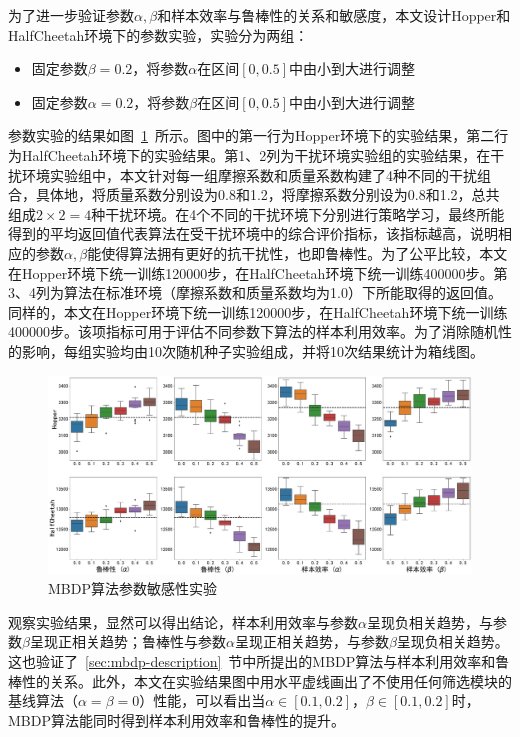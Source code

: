 为了进一步验证参数$\alpha,\beta$和样本效率与鲁棒性的关系和敏感度，本文设计Hopper和HalfCheetah环境下的参数实验，实验分为两组：

\begin{itemize}
    \item 固定参数$\beta=0.2$，将参数$\alpha$在区间$[0,0.5]$中由小到大进行调整
    \item 固定参数$\alpha=0.2$，将参数$\beta$在区间$[0,0.5]$中由小到大进行调整
\end{itemize}

参数实验的结果如图~\ref{fig:hyper-performance}~所示。图中的第一行为Hopper环境下的实验结果，第二行为HalfCheetah环境下的实验结果。第1、2列为干扰环境实验组的实验结果，在干扰环境实验组中，本文针对每一组摩擦系数和质量系数构建了4种不同的干扰组合，具体地，将质量系数分别设为0.8和1.2，将摩擦系数分别设为0.8和1.2，总共组成$2\times 2=4$种干扰环境。在4个不同的干扰环境下分别进行策略学习，最终所能得到的平均返回值代表算法在受干扰环境中的综合评价指标，该指标越高，说明相应的参数$\alpha,\beta$能使得算法拥有更好的抗干扰性，也即鲁棒性。为了公平比较，本文在Hopper环境下统一训练120000步，在HalfCheetah环境下统一训练400000步。第3、4列为算法在标准环境（摩擦系数和质量系数均为1.0）下所能取得的返回值。同样的，本文在Hopper环境下统一训练120000步，在HalfCheetah环境下统一训练400000步。该项指标可用于评估不同参数下算法的样本利用效率。为了消除随机性的影响，每组实验均由10次随机种子实验组成，并将10次结果统计为箱线图。

\begin{figure}[ht]
  \centering
  \includegraphics[width=\textwidth]{figures/hyper-performance.pdf}
  \caption{MBDP算法参数敏感性实验}
  \label{fig:hyper-performance}
\end{figure}

观察实验结果，显然可以得出结论，样本利用效率与参数$\alpha$呈现负相关趋势，与参数$\beta$呈现正相关趋势；鲁棒性与参数$\alpha$呈现正相关趋势，与参数$\beta$呈现负相关趋势。这也验证了~\ref{sec:mbdp-description}~节中所提出的MBDP算法与样本利用效率和鲁棒性的关系。此外，本文在实验结果图中用水平虚线画出了不使用任何筛选模块的基线算法（$\alpha=\beta=0$）性能，可以看出当$\alpha\in[0.1,0.2]$，$\beta\in[0.1,0.2]$时，MBDP算法能同时得到样本利用效率和鲁棒性的提升。

